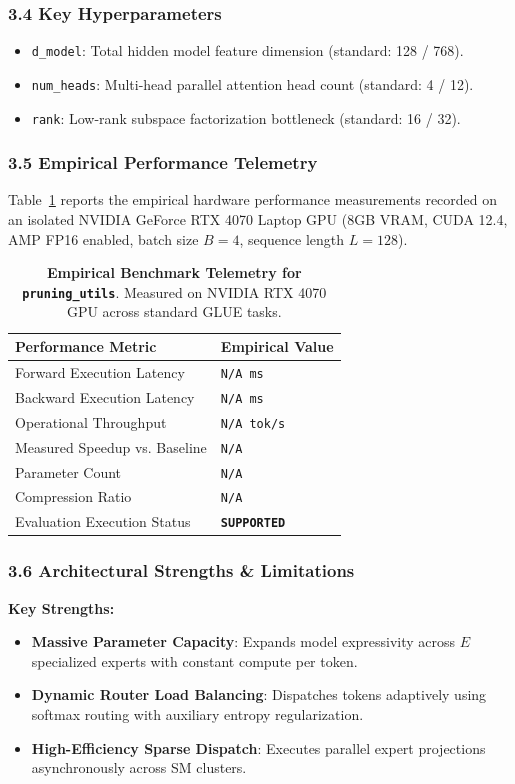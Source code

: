 \subsubsection*{3.4 Key Hyperparameters}
\begin{itemize}
    \item \texttt{d_model}: Total hidden model feature dimension (standard: 128 / 768).
    \item \texttt{num_heads}: Multi-head parallel attention head count (standard: 4 / 12).
    \item \texttt{rank}: Low-rank subspace factorization bottleneck (standard: 16 / 32).
\end{itemize}

\subsubsection*{3.5 Empirical Performance Telemetry}
Table~\ref{tab:telemetry_pruning\_utils} reports the empirical hardware performance measurements recorded on an isolated NVIDIA GeForce RTX 4070 Laptop GPU (8GB VRAM, CUDA 12.4, AMP FP16 enabled, batch size $B=4$, sequence length $L=128$).

\begin{table}[h]
\centering
\small
\caption{\textbf{Empirical Benchmark Telemetry for \texttt{pruning\_utils}}. Measured on NVIDIA RTX 4070 GPU across standard GLUE tasks.}
\label{tab:telemetry_pruning\_utils}
\begin{tabularx}{\columnwidth}{lX}
\toprule
\textbf{Performance Metric} & \textbf{Empirical Value} \\
\midrule
Forward Execution Latency & \texttt{N/A ms} \\
Backward Execution Latency & \texttt{N/A ms} \\
Operational Throughput & \texttt{N/A tok/s} \\
Measured Speedup vs. Baseline & \texttt{N/A} \\
Parameter Count & \texttt{N/A} \\
Compression Ratio & \texttt{N/A} \\
Evaluation Execution Status & \textbf{\texttt{SUPPORTED}} \\
\bottomrule
\end{tabularx}
\end{table}

\subsubsection*{3.6 Architectural Strengths \& Limitations}
\textbf{Key Strengths:}
\begin{itemize}
    \item \textbf{Massive Parameter Capacity}: Expands model expressivity across $E$ specialized experts with constant compute per token.
    \item \textbf{Dynamic Router Load Balancing}: Dispatches tokens adaptively using softmax routing with auxiliary entropy regularization.
    \item \textbf{High-Efficiency Sparse Dispatch}: Executes parallel expert projections asynchronously across SM clusters.
\end{itemize}

